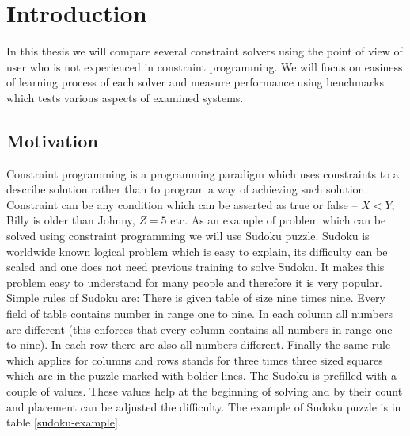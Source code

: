 \chapter{Introduction}
\thispagestyle{myheadings}

In this thesis we will compare several constraint solvers using the point of view of user who is not experienced in constraint programming. We will focus on easiness of learning process of each solver and measure performance using benchmarks which tests various aspects of examined systems. 

\section{Motivation}
Constraint programming is a programming paradigm which uses constraints to a describe solution rather than to program a way of achieving such solution. Constraint can be any condition which can be asserted as true or false -- $X < Y$, Billy is older than Johnny, $Z = 5$ etc.  As an example of problem which can be solved using constraint programming we will use Sudoku puzzle. Sudoku is worldwide known logical problem which is easy to explain, its difficulty can be scaled and one does not need previous training to solve Sudoku. It makes this problem easy to understand for many people and therefore it is very popular. Simple rules of Sudoku are: There is given table of size nine times nine. Every field of table contains number in range one to nine. In each column all numbers are different (this enforces that every column contains all numbers in range one to nine). In each row there are also all numbers different. Finally the same rule which applies for columns and rows stands for three times three sized squares which are in the puzzle marked with bolder lines. The Sudoku is prefilled with a couple of values. These values help at the beginning of solving and by their count and placement can be adjusted the difficulty. The example of Sudoku puzzle is in table \ref{sudoku-example}.

